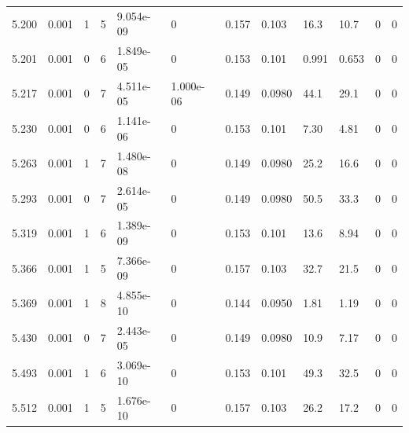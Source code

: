 \documentclass[preview]{standalone}
\begin{document}
{{{{{\begin{tabular}{L{1.2cm}C{1.2cm} C{0.3cm}C{0.5cm} C{1.4cm}C{1.4cm} C{1.4cm}C{1.4cm} C{1.6cm}C{1.6cm} C{1.6cm}C{1.6cm}}
  5.200  &  0.001  & 1     &  5 &  9.054e-09  & 0  &  0.157&   0.103& 16.3 & 10.7   &  0 & 0  \\ 
  5.201  &  0.001  & 0     &  6 &  1.849e-05  & 0  &  0.153&   0.101& 0.991 & 0.653   &  0 & 0  \\ 
  5.217  &  0.001  & 0     &  7 &  4.511e-05  & 1.000e-06  &  0.149&   0.0980& 44.1 & 29.1   &  0 & 0  \\ 
  5.230  &  0.001  & 0     &  6 &  1.141e-06  & 0  &  0.153&   0.101& 7.30 & 4.81   &  0 & 0  \\ 
  5.263  &  0.001  & 1     &  7 &  1.480e-08  & 0  &  0.149&   0.0980& 25.2 & 16.6   &  0 & 0  \\ 
  5.293  &  0.001  & 0     &  7 &  2.614e-05  & 0  &  0.149&   0.0980& 50.5 & 33.3   &  0 & 0  \\ 
  5.319  &  0.001  & 1     &  6 &  1.389e-09  & 0  &  0.153&   0.101& 13.6 & 8.94   &  0 & 0  \\ 
  5.366  &  0.001  & 1     &  5 &  7.366e-09  & 0  &  0.157&   0.103& 32.7 & 21.5   &  0 & 0  \\ 
  5.369  &  0.001  & 1     &  8 &  4.855e-10  & 0  &  0.144&   0.0950& 1.81 & 1.19   &  0 & 0  \\ 
  5.430  &  0.001  & 0     &  7 &  2.443e-05  & 0  &  0.149&   0.0980& 10.9 & 7.17   &  0 & 0  \\ 
  5.493  &  0.001  & 1     &  6 &  3.069e-10  & 0  &  0.153&   0.101& 49.3 & 32.5   &  0 & 0  \\ 
  5.512  &  0.001  & 1     &  5 &  1.676e-10  & 0  &  0.157&   0.103& 26.2 & 17.2   &  0 & 0  \\ 
\hline 
\end{tabular} 

}}}}}
\end{document}
